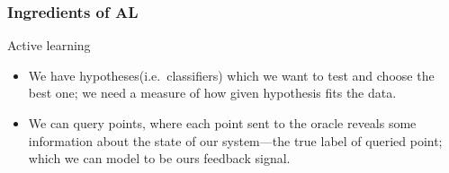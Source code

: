 \documentclass{beamer}
\begin{document}
  \begin{frame}
  \frametitle{Ingredients of AL}
  \begin{block}{Active learning}
    \begin{itemize}
      \item We have hypotheses(i.e.\ classifiers) which we want to test and choose the best one; we need a measure of how given hypothesis fits the data.
      \item We can query points, where each point sent to the oracle reveals some information about the state of our system---the true label of queried point; which we can model to be ours feedback signal.
    \end{itemize}
  \end{block}
  \end{frame}
\end{document}
